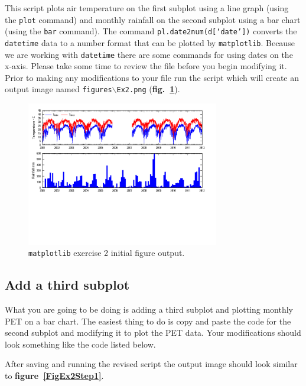 \documentclass[12pt]{article}
\begin{document}
This script plots air temperature on the first subplot using a line graph (using the \texttt{plot} command) and monthly rainfall on the second subplot using a bar chart (using the \texttt{bar} command). The command \texttt{pl.date2num(d[`date'])} converts the \texttt{datetime} data to a number format that can be plotted by \texttt{matplotlib}. Because we are working with \texttt{datetime} there are some commands for using dates on the x-axis. Please take some time to review the file before you begin modifying it. Prior to making any modifications to your file run the script which will create an output image named \texttt{figures$\backslash$Ex2.png} (\textbf{fig.~\ref{FigEx2Base}}).  

\begin{figure}[hp]
	\centering
  	\includegraphics[clip=true,trim=0in 1.5in 0in 0in,width=0.75\textwidth]{../figures/Ex2.png}
 	\caption{\texttt{matplotlib} exercise 2 initial figure output.}
	\label{FigEx2Base}
\end{figure}

\subsection{Add a third subplot}
What you are going to be doing is adding a third subplot and plotting monthly PET on a bar chart. The easiest thing to do is copy and paste the code for the second subplot and modifying it to plot the PET data. Your modifications should look something like the code listed below.

\begin{center}
	
\end{center}

After saving and running the revised script the output image should look similar to \textbf{figure~\ref{FigEx2Step1}}.
\end{document}
